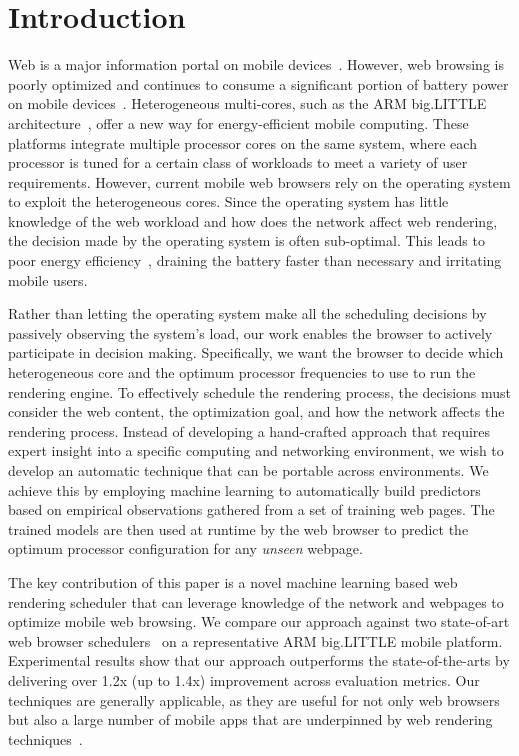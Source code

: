 \section{Introduction}
\vspace{-1mm}

Web is a major information portal on mobile devices~\cite{mobilestat}. However, web browsing is poorly optimized and continues to consume a
significant portion of battery power on mobile devices~\cite{thiagarajan2012killed,d2016energy,cao2017deconstructing}. Heterogeneous
multi-cores, such as the ARM big.LITTLE architecture~\cite{arm},  offer a new way for energy-efficient mobile computing. These platforms
integrate multiple processor cores on the same system, where each processor is tuned for a certain class of workloads to meet a variety of
user requirements. However, current mobile web browsers rely on the operating system to exploit the heterogeneous cores. Since the operating system has little
knowledge of the web workload and how does the network affect web rendering, the decision made by the operating system is often
sub-optimal. This leads to poor energy efficiency~\cite{zhu2015event}, draining the battery faster than necessary and irritating mobile
users. 

Rather than letting the operating system make all the scheduling decisions by passively observing the system's load, our work enables the
browser to actively participate in decision making. Specifically, we want the browser to decide which heterogeneous core and the optimum
processor frequencies to use to run the rendering engine. To effectively schedule the rendering process, the decisions must consider the
web content, the optimization goal, and how the network affects the rendering process. Instead of developing a hand-crafted approach that
requires expert insight into a specific computing and networking environment, we wish to develop an automatic technique that can be
portable across environments. We achieve this by employing machine learning to automatically build predictors based on empirical
observations gathered from a set of training web pages. The
trained models are then used at runtime by the web browser to predict the optimum processor configuration for any \emph{unseen} webpage. %


The key contribution of this paper is a novel machine learning based web rendering scheduler that can leverage knowledge of the network and webpages to optimize mobile web browsing. 
We compare our approach against
two state-of-art web browser schedulers~\cite{YZhu13,ren2016optimise} on a representative ARM big.LITTLE mobile platform. Experimental results show that our approach outperforms the
state-of-the-arts by delivering over 1.2x (up to 1.4x) improvement across evaluation metrics.
Our techniques are generally applicable, as they are
useful for not only web browsers but also a large number of mobile apps that are underpinned by web rendering techniques~\cite{Charland}.
